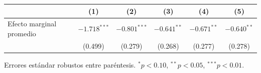 
\begin{tabular}{lccccc}
\toprule
 & (1) & (2) & (3) & (4) & (5)\\
\midrule
Efecto marginal promedio & $-1.718^{***}$ & $-0.801^{***}$ & $-0.641^{**}$ & $-0.671^{**}$ & $-0.640^{**}$\\
 & (0.499) & (0.279) & (0.268) & (0.277) & (0.278)\\
\bottomrule
\end{tabular}
\par\vspace{3pt}
{\footnotesize\parbox{0.9\linewidth}{\centering Errores est\'andar robustos entre par\'entesis. $^{*}p<0.10$, $^{**}p<0.05$, $^{***}p<0.01$.}}
